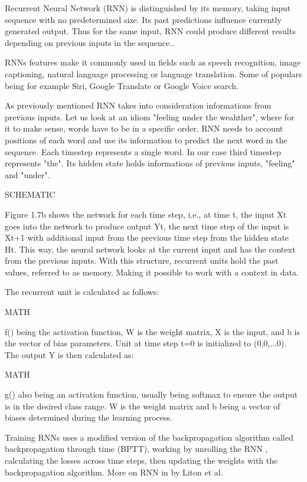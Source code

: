 Recurrent Neural Network (RNN) is distinguished by its memory, taking input sequence with no predetermined size. Its past predictions influence currently generated output. Thus for the same input, RNN could produce different results depending on previous inputs in the sequence.\cite{rnnDSmedium}.

{\color{red}
RNNs features make it commonly used in fields such as speech recognition, image captioning, natural language processing or language translation. Some of populars being for example Siri, Google Translate or Google Voice search.\cite{ibmrnn}

As previously mentioned RNN takes into consideration informations from previous inputs. Let us look at an idiom "feeling under the weahther", where for it to make sense, words have to be in a specific order. RNN needs to account positions of each word and use its information to predict the next word in the sequence. Each timestep represents a single word. In our case third timestep represents "the". Its hidden state holds informations of previous inputs, "feeling" and "under".\cite{ibmrnn}
}

SCHEMATIC

Figure 1.7b shows the network for each time step, i.e., at time t, the input Xt goes into the network to produce output Yt, the next time step of the input is Xt+1 with additional input from the previous time step from the hidden state Ht. This way, the neural network looks at the current input and has the context from the previous inputs.
With this structure, recurrent units hold the past values, referred to as memory. Making it possible to work with a context in data.
\cite{rnnin6}

The recurrent unit is calculated as follows:

MATH

f() being the activation function, W is the weight matrix, X is the input, and b is the vector of bias parameters. Unit at time step t=0 is initialized to (0,0,...0). The output Y is then calculated as:

MATH

g() also being an activation function, usually being softmax to ensure the output is in the desired class range. W is the weight matrix and b being a vector of biases determined during the learning process.

Training RNNs uses a modified version of the backpropagation algorithm called backpropagation through time (BPTT), working by unrolling the RNN \cite{Goodfellow-et-al-2016}, calculating the losses across time steps, then updating the weights with the backpropagation algorithm. More on RNN in \cite{lipton2015critical} by Liton et al.





